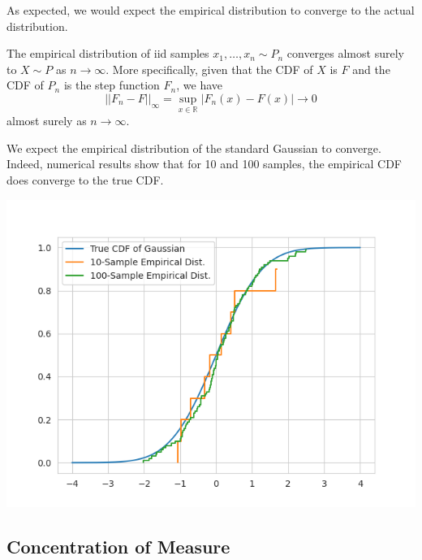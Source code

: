   As expected, we would expect the empirical distribution to converge to the actual distribution. 

  \begin{theorem}
    The empirical distribution of iid samples $x_1, \ldots, x_n \sim P_n$ converges almost surely to $X \sim P$ as $n \rightarrow \infty$. More specifically, given that the CDF of $X$ is $F$ and the CDF of $P_n$ is the step function $F_n$, we have 
    \begin{equation}
      ||F_n - F||_{\infty} = \sup_{x \in \mathbb{R}} |F_n (x) - F(x)| \rightarrow 0
    \end{equation}
    almost surely as $n \rightarrow \infty$. 
  \end{theorem}

  \begin{example}
    We expect the empirical distribution of the standard Gaussian to converge. Indeed, numerical results show that for 10 and 100 samples, the empirical CDF does converge to the true CDF. 

    \begin{center}
      \includegraphics[scale=0.4]{img/empirical_distribution.png}
    \end{center}
  \end{example}

\subsection{Concentration of Measure}

